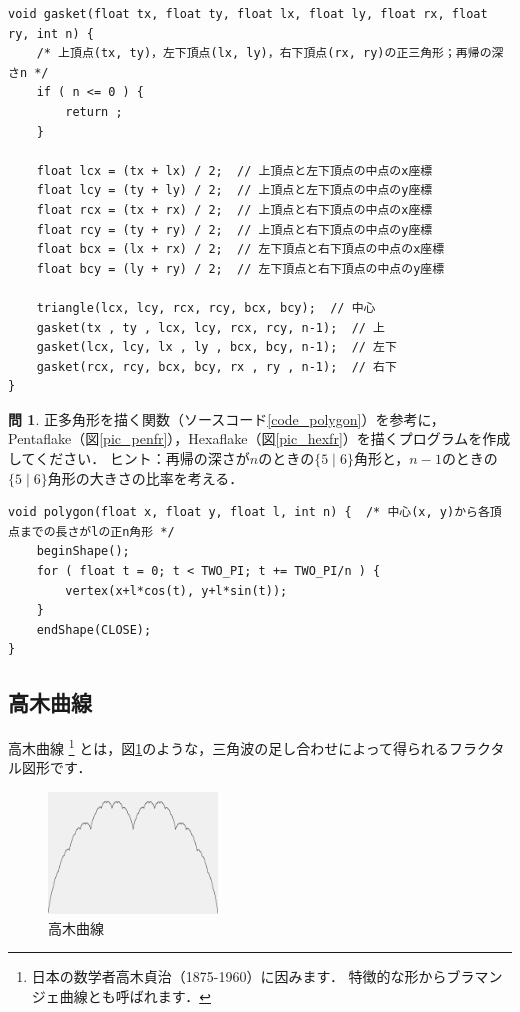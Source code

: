 \documentclass[dvipdfmx]{jsarticle}
\theoremstyle{definition}
\newtheorem{question}{問}[section]
\begin{document}
\begin{lstlisting}[caption=Sierpinskiのギャスケットを描く再帰関数, label=code_gasket]
void gasket(float tx, float ty, float lx, float ly, float rx, float ry, int n) {
    /* 上頂点(tx, ty)，左下頂点(lx, ly)，右下頂点(rx, ry)の正三角形；再帰の深さn */
    if ( n <= 0 ) {
        return ;
    }

    float lcx = (tx + lx) / 2;  // 上頂点と左下頂点の中点のx座標
    float lcy = (ty + ly) / 2;  // 上頂点と左下頂点の中点のy座標
    float rcx = (tx + rx) / 2;  // 上頂点と右下頂点の中点のx座標
    float rcy = (ty + ry) / 2;  // 上頂点と右下頂点の中点のy座標
    float bcx = (lx + rx) / 2;  // 左下頂点と右下頂点の中点のx座標
    float bcy = (ly + ry) / 2;  // 左下頂点と右下頂点の中点のy座標

    triangle(lcx, lcy, rcx, rcy, bcx, bcy);  // 中心
    gasket(tx , ty , lcx, lcy, rcx, rcy, n-1);  // 上
    gasket(lcx, lcy, lx , ly , bcx, bcy, n-1);  // 左下
    gasket(rcx, rcy, bcx, bcy, rx , ry , n-1);  // 右下
}
\end{lstlisting}

\begin{question}
    正多角形を描く関数（ソースコード\ref{code_polygon}）を参考に，
    Pentaflake（図\ref{pic_penfr}），Hexaflake（図\ref{pic_hexfr}）を描くプログラムを作成してください．
    ヒント：再帰の深さが$n$のときの$\{5\mid6\}$角形と，$n-1$のときの$\{5\mid6\}$角形の大きさの比率を考える．
\end{question}

\clearpage

\begin{lstlisting}[caption=正多角形を描く関数, label=code_polygon]
void polygon(float x, float y, float l, int n) {  /* 中心(x, y)から各頂点までの長さがlの正n角形 */
    beginShape();
    for ( float t = 0; t < TWO_PI; t += TWO_PI/n ) {
        vertex(x+l*cos(t), y+l*sin(t));
    }
    endShape(CLOSE);
}
\end{lstlisting}

\subsection{高木曲線}  \label{subsec_takagi_curve}
高木曲線
\footnote{
    日本の数学者高木貞治（1875-1960）に因みます．
    特徴的な形からブラマンジェ曲線とも呼ばれます．
}
とは，図\ref{pic_takagi_curve}のような，三角波の足し合わせによって得られるフラクタル図形です．
%
\begin{figure}[H]
    \centering
    \includegraphics[width=0.4\textwidth]{figure/takagi/takagi_curve.png}
    \caption{高木曲線}
    \label{pic_takagi_curve}
\end{figure}
\end{document}
